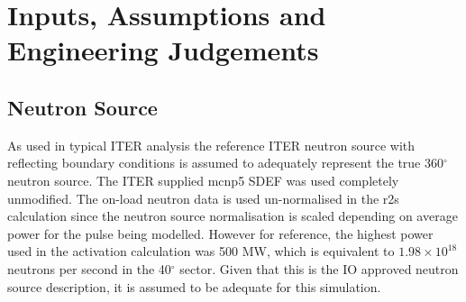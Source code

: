 \documentclass[12pt]{article}
\begin{document}

\clearpage
\newpage
\section{Inputs, Assumptions and Engineering Judgements}

\subsection{Neutron Source}
As used in typical ITER analysis the reference ITER neutron source with
reflecting boundary conditions is assumed to adequately represent the
true 360$^{\circ}$ neutron source. The ITER supplied \gls{mcnp5} SDEF was used
completely unmodified. The on-load neutron data is used un-normalised
in the \gls{r2s} calculation since the neutron source normalisation is scaled
depending on average power for the pulse being modelled. However for reference,
the highest power used in the activation calculation was 500 MW, which is
equivalent to $1.98 \times 10^{18}$ neutrons per second in the 40$^{\circ}$
sector. Given that this is the IO approved neutron source description, it is
assumed to be adequate for this simulation.
\end{document}
